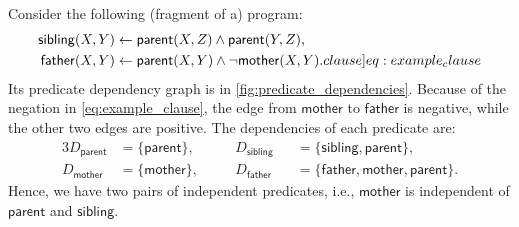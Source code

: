 \documentclass[runningheads]{llncs}
\begin{document}
\begin{example} \label{ex:program}
  Consider the following (fragment of a) program:
  \begin{align}
    \mathsf{sibling}(X, Y) &\gets \mathsf{parent}(X, Z) \land \mathsf{parent}(Y, Z), \nonumber \\
    \mathsf{father}(X, Y) &\gets \mathsf{parent}(X, Y) \land \neg\mathsf{mother}(X, Y). \label[clause]{eq:example_clause}
  \end{align}
  Its predicate dependency graph is in \cref{fig:predicate_dependencies}.
  Because of the negation in \eqref{eq:example_clause}, the edge from
  $\mathsf{mother}$ to $\mathsf{father}$ is negative, while the other two edges
  are positive. The dependencies of each predicate are:
  \begin{alignat*}{3}
    D_{\mathsf{parent}} &= \{ \mathsf{parent} \}, \quad && D_{\mathsf{sibling}}
    &&= \{\mathsf{sibling}, \mathsf{parent} \},\\
    D_{\mathsf{mother}} &= \{ \mathsf{mother} \}, \quad && D_{\mathsf{father}}
    &&= \{ \mathsf{father}, \mathsf{mother}, \mathsf{parent} \}.
  \end{alignat*}
  Hence, we have two pairs of independent predicates, i.e., $\mathsf{mother}$ is
  independent of $\mathsf{parent}$ and $\mathsf{sibling}$.
\end{example}
\end{document}
